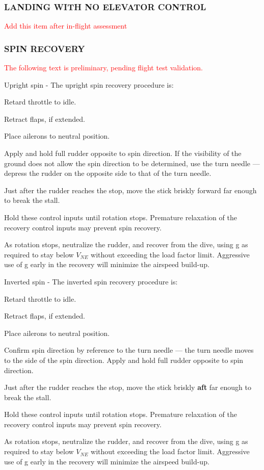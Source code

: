 \subsubsection{LANDING WITH NO ELEVATOR CONTROL}
\textcolor{red}{Add this item after in-flight assessment}

\subsubsection{SPIN RECOVERY}
\textcolor{red}{The following text is preliminary, pending flight test validation.}

Upright spin - The upright spin recovery procedure is:
\begin{enumerate*}
  \item Retard throttle to idle.
  \item Retract flaps, if extended.
  \item Place ailerons to neutral position.
  \item Apply and hold full rudder opposite to spin direction.  If the visibility of the ground does not allow the spin direction to be determined, use the turn needle --- depress the rudder on the opposite side to that of the turn needle.
  \item Just after the rudder reaches the stop, move the stick briskly forward far enough to break the stall.
  \item Hold these control inputs until rotation stops.  Premature relaxation of the recovery control inputs may prevent spin recovery.
  \item As rotation stops, neutralize the rudder, and recover from the dive, using g as required to stay below $V_{NE}$ without exceeding the load factor limit.  Aggressive use of g early in the recovery will minimize the airspeed build-up.
  \end{enumerate*}
  
Inverted spin - The inverted spin recovery procedure is:
\begin{enumerate*}
  \item Retard throttle to idle.
  \item Retract flaps, if extended.
  \item Place ailerons to neutral position.
  \item Confirm spin direction by reference to the turn needle --- the turn needle moves to the side of the spin direction.  Apply and hold full rudder opposite to spin direction.  
  \item Just after the rudder reaches the stop, move the stick briskly \textbf{aft} far enough to break the stall.
  \item Hold these control inputs until rotation stops.  Premature relaxation of the recovery control inputs may prevent spin recovery.
  \item As rotation stops, neutralize the rudder, and recover from the dive, using g as required to stay below $V_{NE}$ without exceeding the load factor limit.  Aggressive use of g early in the recovery will minimize the airspeed build-up.
  \end{enumerate*}

